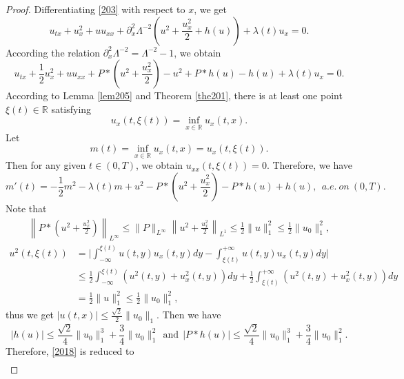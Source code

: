 \documentclass[preprint,12pt]{elsarticle}
\numberwithin{equation}{section}
\begin{document}
\begin{proof}
Differentiating  \eqref{203} with respect to $x$, we get
\begin{equation}
u_{tx}+u_{x}^{2}+uu_{xx}+\partial_{x}^{2}\Lambda^{-2}(u^{2}+\frac{u_{x}^{2}}{2}+h(u))+\lambda(t) u_{x}=0.
\label{2016}
\end{equation}
According the relation $\partial_{x}^{2}\Lambda^{-2}=\Lambda^{-2}-1$, we obtain
\begin{equation}
u_{tx}+\frac{1}{2}u_{x}^{2}+uu_{xx}+P\ast\left(u^{2}+\frac{u_{x}^{2}}{2}\right)-u^{2}
+P\ast h(u)-h(u)+\lambda(t) u_{x}=0.
\label{2017}
\end{equation}
According to Lemma \ref{lem205} and Theorem \ref{the201}, there is at least one point $\xi(t)\in \mathbb{R}$ satisfying
$$u_{x}(t,\xi(t))=\inf_{x\in\mathbb{R}}u_{x}(t,x).$$
Let
\begin{equation*}
m(t)=\inf_{x\in \mathbb{R}}u_{x}(t,x)=u_{x}(t,\xi(t)).
\end{equation*}
Then for any given $t\in(0,T)$, we obtain $u_{xx}(t,\xi(t))=0$. Therefore, we have
\begin{equation}
m'(t)=-\frac{1}{2}m^{2}-\lambda(t) m +u^{2}-P\ast\left(u^{2}+\frac{u_{x}^{2}}{2}\right)
-P\ast h(u)+h(u),\ \ a.e.\ on\ (0,T).
\label{2018}
\end{equation}
Note that
\begin{align*}
\left\|P\ast\left(u^{2}+\frac{u_{x}^{2}}{2}\right)\right\|_{L^{\infty}}\leq
\|P\|_{L^{\infty}}\left\|u^{2}+\frac{u_{x}^{2}}{2}\right\|_{L^{1}}
\leq\frac{1}{2}\|u\|_{1}^{2}
\leq\frac{1}{2}\|u_{0}\|_{1}^{2},
\end{align*}
\begin{align*}
u^{2}(t,\xi(t))&=\Big|\int_{-\infty}^{\xi(t)}u(t,y)u_{x}(t,y)dy
-\int_{\xi(t)}^{+\infty}u(t,y)u_{x}(t,y)dy\Big|\nonumber\\
&\leq\frac{1}{2}\int_{-\infty}^{\xi(t)}(u^{2}(t,y)+u_{x}^{2}(t,y))dy
+\frac{1}{2}\int_{\xi(t)}^{+\infty}(u^{2}(t,y)+u_{x}^{2}(t,y))dy\nonumber\\
&=\frac{1}{2}\|u\|_{1}^{2}\leq\frac{1}{2}\|u_{0}\|_{1}^{2},
\end{align*}
thus we get $|u(t,x)|\leq \frac{\sqrt{2}}{2}\|u_{0}\|_{1}.$ Then we have
\begin{equation*}
|h(u)|\leq \frac{\sqrt{2}}{4}\|u_{0}\|^{3}_{1}+\frac{3}{4}\|u_{0}\|^{2}_{1}
\ \ \text{and}\ \
|P\ast h(u)|\leq \frac{\sqrt{2}}{4}\|u_{0}\|^{3}_{1}+\frac{3}{4}\|u_{0}\|^{2}_{1}.
\end{equation*}
Therefore, \eqref{2018} is reduced to
\begin{align}

\end{align}
\end{proof}
\end{document}
